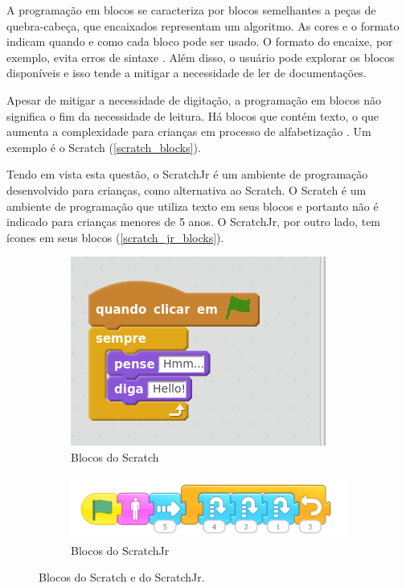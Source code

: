 A programação em blocos se caracteriza por blocos semelhantes a peças de quebra-cabeça, que encaixados representam um algoritmo. As cores e o formato indicam quando e como cada bloco pode ser usado. O formato do encaixe, por exemplo, evita erros de sintaxe \cite{weintrop_block-based_2019}. Além disso, o usuário pode explorar os blocos disponíveis e isso tende a mitigar a necessidade de ler de documentações.

Apesar de mitigar a necessidade de digitação, a programação em blocos não significa o fim da necessidade de leitura. Há blocos que contém texto, o que aumenta a complexidade para crianças em processo de alfabetização \cite{flannery_designing_2013}. Um exemplo é o Scratch (\autoref{scratch_blocks}).

Tendo em vista esta questão, o ScratchJr é um ambiente de programação desenvolvido para crianças, como alternativa ao Scratch. O Scratch é um ambiente de programação que utiliza texto em seus blocos e portanto não é indicado para crianças menores de 5 anos. O ScratchJr, por outro lado, tem ícones em seus blocos (\autoref{scratch_jr_blocks}).

\begin{figure}[!htbp]
    \centering
    \begin{subfigure}{.35\textwidth}
        \centering
        \includegraphics[width=.9\linewidth,fbox]{figs/scratch_blocos.png}
        \caption{Blocos do Scratch}
        \label{scratch_blocks}
    \end{subfigure}%
    \begin{subfigure}{.65\textwidth}
        \centering
        \includegraphics[width=.9\linewidth,fbox]{figs/scratch_jr.png}
        \caption{Blocos do ScratchJr}
        \label{scratch_jr_blocks}
    \end{subfigure}
    \caption{Blocos do Scratch e do ScratchJr.}
    \sourceauthor
    \label{scratch_scratch_jr_blocks}
\end{figure}

